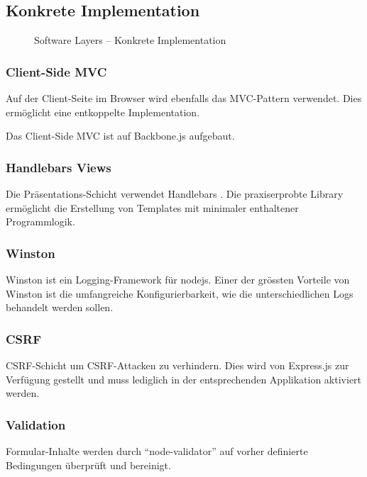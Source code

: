 \newpage
\subsection*{Konkrete Implementation}

\begin{figure}[ht!]
	\centering{
		
	}

	\caption{Software Layers -- Konkrete Implementation}
\end{figure}

\subsubsection*{Client-Side MVC}
Auf der Client-Seite im Browser wird ebenfalls das MVC-Pattern \cite{MVC}verwendet. Dies ermöglicht eine entkoppelte Implementation.

Das Client-Side MVC ist auf Backbone.js \cite{Backbonejs} aufgebaut.

\subsubsection*{Handlebars Views}
Die Präsentations-Schicht verwendet Handlebars \cite{Handlebars}. Die praxiserprobte Library ermöglicht die Erstellung von Templates mit minimaler enthaltener Programmlogik.

\subsubsection*{Winston}
Winston \cite{Winston} ist ein Logging-Framework für \gls{nodejs}. Einer der grössten Vorteile von Winston ist die umfangreiche Konfigurierbarkeit, wie die unterschiedlichen Logs behandelt werden sollen.

\subsubsection*{CSRF}
\gls{CSRF}-Schicht um CSRF-Attacken zu verhindern. Dies wird von Express.js zur Verfügung gestellt \cite{ExpressjsCSRF} und muss lediglich in der entsprechenden Applikation aktiviert werden.

\subsubsection*{Validation}
Formular-Inhalte werden durch ``node-validator'' \cite{nodevalidator} auf vorher definierte Bedingungen überprüft und bereinigt.

